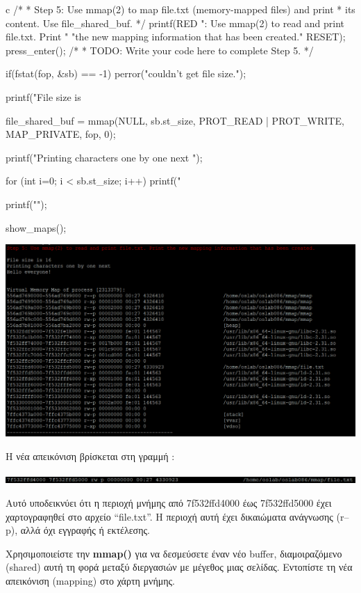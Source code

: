 \documentclass[12pt]{article}
\begin{document}
\begin{codeless}{c}
    /*
	 * Step 5: Use mmap(2) to map file.txt (memory-mapped files) and print
	 * its content. Use file_shared_buf.
	 */
	printf(RED ": Use mmap(2) to read and print file.txt. Print "
		"the new mapping information that has been created.\n" RESET);
	press_enter();
	/*
	 * TODO: Write your code here to complete Step 5.
	 */
	
	if(fstat(fop, &sb) == -1)
	{
		perror("couldn't get file size.\n");
	}
	
	printf("File size is %

	file_shared_buf = mmap(NULL, sb.st_size, PROT_READ | PROT_WRITE, MAP_PRIVATE, fop, 0);
	
	printf("Printing characters one by one next \n");	
	
	for (int i=0; i < sb.st_size; i++)
	{	
		printf("%
	}
	
	printf("\n");

	show_maps();
\end{codeless}

\centerline{\includegraphics[width=1\textwidth]{3_1_5.png}}

Η νέα απεικόνιση βρίσκεται στη γραμμή :

\centerline{\includegraphics[width=1\textwidth]{3_1_5_new.png}}

Αυτό υποδεικνύει ότι η περιοχή μνήμης από 7f532ffd4000 έως 7f532ffd5000
έχει χαρτογραφηθεί στο αρχείο “file.txt”. 
Η περιοχή αυτή έχει δικαιώματα ανάγνωσης (r--p), αλλά όχι εγγραφής ή εκτέλεσης.

\begin{question}
Χρησιμοποιείστε την \textbf{mmap()} για να δεσμεύσετε έναν νέο buffer, διαμοιραζόμενο
(shared) αυτή τη φορά μεταξύ διεργασιών με μέγεθος μιας σελίδας. Εντοπίστε τη
νέα απεικόνιση (mapping) στο χάρτη μνήμης.
\end{question}
\end{document}
